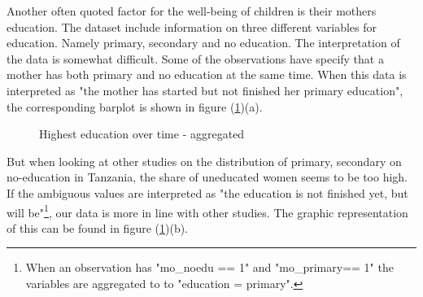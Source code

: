 \documentclass[a4paper, 11pt]{article} %
\begin{document}
Another often quoted factor for the well-being of children is their mothers education. The dataset include information on three different variables for education. Namely primary, secondary and no education. The interpretation of the data is somewhat difficult. Some of the observations have specify that a mother has both primary and no education at the same time. When this data is interpreted as "the mother has started but not finished her primary education", the corresponding barplot is shown in figure (\ref{fig:education_proportion})(a). 

\begin{figure}[h!]
    \centering
    \qquad
    \caption{Highest education over time - aggregated}%
    \label{fig:education_proportion}%
\end{figure}

But when looking at other studies \cite{SAM08} on the distribution of primary, secondary on no-education in Tanzania, the share of uneducated women seems to be too high. If the ambiguous values are interpreted as "the education is not finished yet, but will be"\footnote{When an observation has "mo\_noedu == 1" and "mo\_primary== 1" the variables are aggregated to  to "education = primary".}, our data is more in line with other studies. The graphic representation of this can be found in figure (\ref{fig:education_proportion})(b).  
\end{document}
